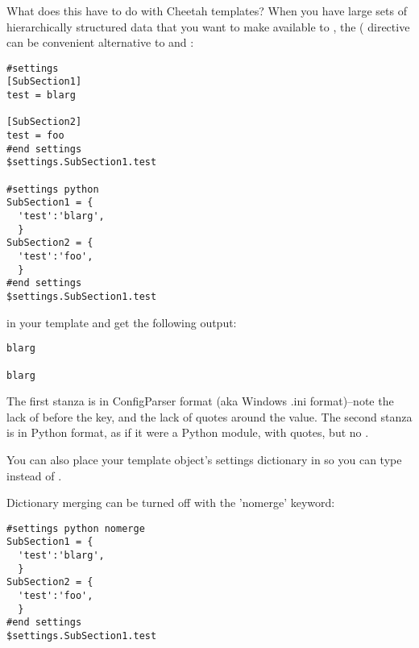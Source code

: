 What does this have to do with Cheetah templates? When you have large sets of
hierarchically structured data that you want to make available to
, the ( directive can be convenient
alternative to  and :

\begin{verbatim}
#settings
[SubSection1]
test = blarg

[SubSection2]
test = foo
#end settings
$settings.SubSection1.test

#settings python
SubSection1 = {
  'test':'blarg',
  }
SubSection2 = {
  'test':'foo',
  }
#end settings
$settings.SubSection1.test
\end{verbatim}

in your template and get the following output:

\begin{verbatim}
blarg

blarg
\end{verbatim}

The first stanza is in ConfigParser format (aka Windows .ini format)--note the
lack of \code{\$} before the key, and the lack of quotes around the value.  The
second stanza is in Python format, as if it were a Python module, with quotes,
but no \code{\$}.

You can also place your template object's settings dictionary in  so you can type  instead of
.

Dictionary merging can be turned off with the 'nomerge' keyword:

\begin{verbatim}
#settings python nomerge
SubSection1 = {
  'test':'blarg',
  }
SubSection2 = {
  'test':'foo',
  }
#end settings
$settings.SubSection1.test
\end{verbatim}

